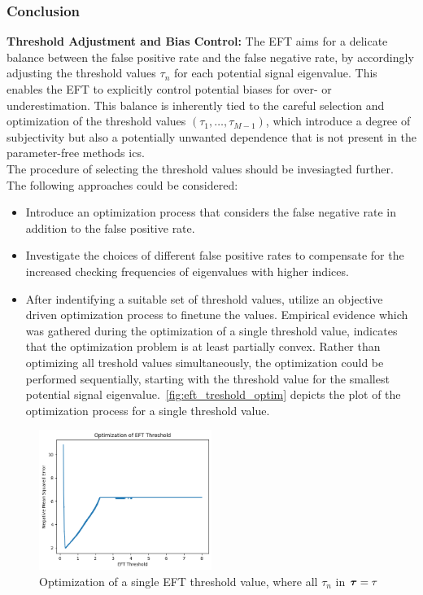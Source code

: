 \subsubsection*{Conclusion}

\textbf{Threshold Adjustment and Bias Control:} The EFT aims for a delicate balance between the false
positive rate and the false negative rate, by accordingly adjusting the threshold values \( \tau_n \) for each potential
signal eigenvalue. This enables the EFT to explicitly control potential biases for over- or underestimation.
This balance is inherently tied to the careful selection and optimization of the threshold values
\( (\tau_1, \ldots, \tau_{M-1}) \), which introduce a degree of subjectivity but also a potentially
unwanted dependence that is not present in the parameter-free methods \glspl{ic}.\\
The procedure of selecting the threshold values should be invesiagted further. The following approaches could be considered:
\begin{itemize}
    \item Introduce an optimization process that considers the false negative rate in addition to the false positive rate.
    \item Investigate the choices of different false positive rates to compensate for the increased checking frequencies of
    eigenvalues with higher indices.
    \item After indentifying a suitable set of threshold values, utilize an objective driven optimization process to finetune
    the values. Empirical evidence which was gathered during the optimization of a single threshold value, indicates that
    the optimization problem is at least partially convex. Rather than optimizing all treshold values simultaneously,
    the optimization could be performed sequentially, starting with the threshold value for the smallest potential signal
    eigenvalue.~\autoref{fig:eft_treshold_optim} depicts the plot of the optimization process for a single threshold value.
\end{itemize}
\begin{figure}[H]
    \centering
    \includegraphics[width=0.5\textwidth]{figures/04_ModelOrderEstimation/eft_treshold.png}
    \caption{Optimization of a single EFT threshold value, where all \( \tau_n \) in \( \boldsymbol{\tau} = \tau \)}
    \label{fig:eft_treshold_optim}
\end{figure}

